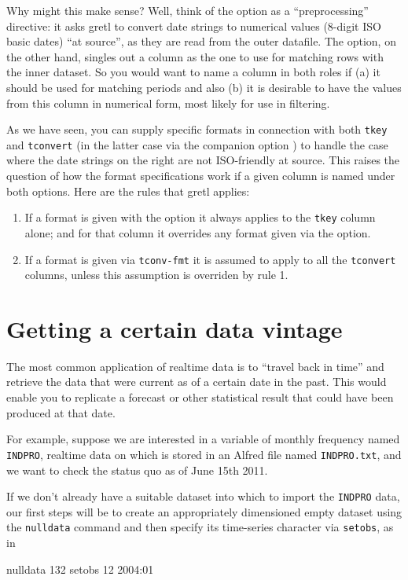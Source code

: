 Why might this make sense? Well, think of the  option
as a ``preprocessing'' directive: it asks gretl to convert date
strings to numerical values (8-digit ISO basic dates) ``at source'',
as they are read from the outer datafile. The  option, on
the other hand, singles out a column as the one to use for matching
rows with the inner dataset. So you would want to name a column in
both roles if (a) it should be used for matching periods and also (b)
it is desirable to have the values from this column in numerical
form, most likely for use in filtering.

As we have seen, you can supply specific formats in connection with
both \texttt{tkey} and \texttt{tconvert} (in the latter case via the
companion option ) to handle the case where the
date strings on the right are not ISO-friendly at source. This raises
the question of how the format specifications work if a given
column is named under both options.  Here are the rules that gretl
applies:
\begin{enumerate}
\item If a format is given with the  option it always
  applies to the \texttt{tkey} column alone; and for that column it
  overrides any format given via the  option.
\item If a format is given via \texttt{tconv-fmt} it is assumed to
  apply to all the \texttt{tconvert} columns, unless this assumption
  is overriden by rule 1.
\end{enumerate}

\section{Getting a certain data vintage}
\label{sec:realtime-vintage}

The most common application of realtime data is to ``travel back in
time'' and retrieve the data that were current as of a certain date
in the past. This would enable you to replicate a forecast or other
statistical result that could have been produced at that date.

For example, suppose we are interested in a variable of monthly
frequency named \texttt{INDPRO}, realtime data on which is stored in
an Alfred file named \texttt{INDPRO.txt}, and we want to check the
status quo as of June 15th 2011.

If we don't already have a suitable dataset into which to import the
\texttt{INDPRO} data, our first steps will be to create an
appropriately dimensioned empty dataset using the \texttt{nulldata}
command and then specify its time-series character via
\texttt{setobs}, as in
\begin{code}
nulldata 132
setobs 12 2004:01
\end{code}

